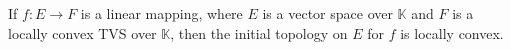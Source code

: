 If $f: E \rightarrow F$ is a linear mapping, where $E$ is a vector space over $\mathbb{K}$ and $F$ is a locally convex TVS over $\mathbb{K}$, then the initial topology on $E$ for $f$ is locally convex.